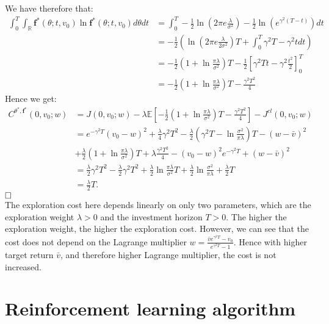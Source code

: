 \documentclass[oneside, a4paper, onecolumn, 11pt]{article}
\begin{document}
We have therefore that: 
\begin{align*}
    \int_{0}^{T}\int_{\mathbb{R}} \boldsymbol{f}^*(\theta;t, v_0)\ln \boldsymbol{f}^*(\theta;t, v_0)d\theta dt&=  \int_{0}^{T}-\frac{1}{2}\ln \left(2\pi e \frac{\lambda}{\sigma^2}\right) -\frac{1}{2}\ln\left(e^{\gamma^2(T-t)}\right)dt\\
    &= -\frac{1}{2}\left(\ln\left(2\pi e \frac{\lambda}{2\sigma^2}\right)T + \int_{0}^{T}\gamma^2T-\gamma^2t dt \right)\\ 
    &= - \frac{1}{2}\left(1 + \ln\frac{\pi\lambda}{\sigma^2}\right)T -\frac{1}{2}\left[\gamma^2Tt - \gamma^2\frac{t^2}{2}\right]_{0}^{T} \\ 
    &= - \frac{1}{2}\left(1 + \ln\frac{\pi\lambda}{\sigma^2}\right)T - \frac{\gamma^2T^2}{4}
\end{align*}
Hence we get:
\begin{align*}
 C^{\theta^*, \boldsymbol{f}^*}(0, v_0; w) &= J(0,v_0; w) - \lambda\mathbb{E}\left[-\frac{1}{2}\left(1+ \ln\frac{\pi\lambda}{\sigma^2}\right)T - \frac{\gamma^2 T^2}{4} \right]   - J^{cl}(0,v_0;w)\\ 
 &= e^{-\gamma^2T}(v_0- w)^2 + \frac{\lambda}{4}\gamma^2T^2 - \frac{\lambda}{2}\left(\gamma^2T - \ln\frac{\sigma^2}{\pi\lambda}\right)T -(w- \bar{v})^2 \\ & + \frac{\lambda}{2}\left(1+\ln{\frac{\pi\lambda}{\sigma^2}}\right)T +\lambda\frac{\gamma^2T^2}{4}- (v_0 -w)^2e^{-\gamma^2T} + (w- \bar{v})^2\\ 
 &= \frac{\lambda}{2}\gamma^2 T^2 -\frac{\lambda}{2}\gamma^2T^2 + \frac{\lambda}{2}\ln{\frac{\pi\lambda}{\sigma^2}}T + \frac{\lambda}{2}\ln{\frac{\sigma^2}{\pi\lambda}} + \frac{\lambda}{2}T\\ 
 &= \frac{\lambda}{2}T.
\end{align*}
 $\hfill \square$ 
\\The exploration cost here depends linearly on only two parameters, which are the exploration weight $\lambda>0$ and the investment horizon $T>0$. The higher the exploration weight, the higher the exploration cost. However, we can see that the cost does not depend on the Lagrange multiplier $w=\frac{\bar{v}e^{\gamma^2T} - v_0}{ e^{\gamma^2T} -1 }$. Hence with higher target return $\bar{v}$, and therefore higher Lagrange multiplier, the cost is not increased. 
\\\section{Reinforcement learning algorithm}
\end{document}
